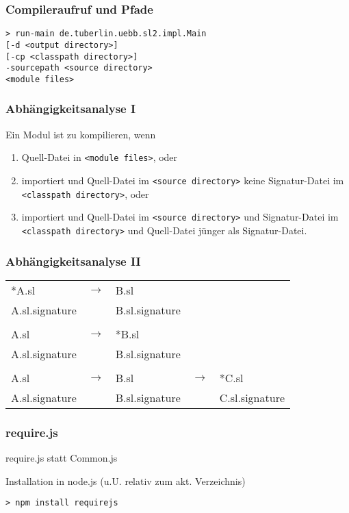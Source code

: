 \begin{frame}[containsverbatim=true]
\frametitle{Compileraufruf und Pfade}
\begin{verbatim}
> run-main de.tuberlin.uebb.sl2.impl.Main 
[-d <output directory>]
[-cp <classpath directory>]
-sourcepath <source directory>
<module files>
\end{verbatim}
\end{frame}

\begin{frame}
\frametitle{Abhängigkeitsanalyse I}
Ein Modul ist zu kompilieren, wenn
\begin{enumerate}
\item Quell-Datei in \texttt{<module files>}, oder
\item importiert\linebreak
    und Quell-Datei im \texttt{<source directory>}\linebreak
    keine Signatur-Datei im \texttt{<classpath directory>}, oder
\item importiert\linebreak
    und Quell-Datei im \texttt{<source directory>}\linebreak
    und Signatur-Datei im \texttt{<classpath directory>}\linebreak
    und Quell-Datei jünger als Signatur-Datei.
\end{enumerate}
\end{frame}

\begin{frame}
\frametitle{Abhängigkeitsanalyse II}
\begin{tabularx}{\linewidth}{lllll}
*A.sl          & $\rightarrow$ & B.sl           & & \\
A.sl.signature &               & B.sl.signature & & \\
 & & & & \\
A.sl           & $\rightarrow$ & *B.sl & & \\
A.sl.signature &               & B.sl.signature & & \\
 & & & & \\
A.sl           & $\rightarrow$ & B.sl           & $\rightarrow$ & *C.sl \\
A.sl.signature &               & B.sl.signature &               & C.sl.signature \\
\end{tabularx}
\end{frame}

\begin{frame}[containsverbatim=true]
\frametitle{require.js}
require.js statt Common.js

\vspace{1em}

Installation in node.js (u.U. relativ zum akt. Verzeichnis)

\begin{verbatim}
> npm install requirejs
\end{verbatim}
\end{frame}

